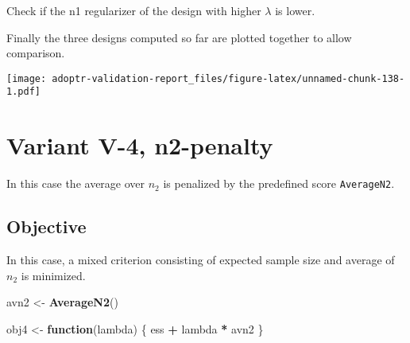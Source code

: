 \documentclass[]{book}
\newenvironment{Shaded}{\begin{snugshade}}{\end{snugshade}}
\newcommand{\ControlFlowTok}[1]{\textcolor[rgb]{0.13,0.29,0.53}{\textbf{#1}}}
\newcommand{\DecValTok}[1]{\textcolor[rgb]{0.00,0.00,0.81}{#1}}
\newcommand{\KeywordTok}[1]{\textcolor[rgb]{0.13,0.29,0.53}{\textbf{#1}}}
\newcommand{\NormalTok}[1]{#1}
\newcommand{\OperatorTok}[1]{\textcolor[rgb]{0.81,0.36,0.00}{\textbf{#1}}}
\newcommand{\StringTok}[1]{\textcolor[rgb]{0.31,0.60,0.02}{#1}}
\begin{document}
\begin{Shaded}
\end{Shaded}

Check if the n1 regularizer of the design with higher \(\lambda\) is lower.

\begin{Shaded}
\end{Shaded}

Finally the three designs computed so far are plotted together to allow
comparison.

\texttt{[image: adoptr-validation-report\_files/figure-latex/unnamed-chunk-138-1.pdf]}

\hypertarget{variantV_4}{%
\section{Variant V-4, n2-penalty}\label{variantV_4}}

In this case the average over \(n_2\) is penalized by the predefined score
\texttt{AverageN2}.

\hypertarget{objective-13}{%
\subsection{Objective}\label{objective-13}}

In this case, a mixed criterion consisting of expected sample size and
average of \(n_2\) is minimized.

\begin{Shaded}
\begin{Highlighting}[]
\NormalTok{avn2 <-}\StringTok{ }\KeywordTok{AverageN2}\NormalTok{()}

\NormalTok{obj4 <-}\StringTok{ }\ControlFlowTok{function}\NormalTok{(lambda) \{}
\NormalTok{    ess }\OperatorTok{+}\StringTok{ }\NormalTok{lambda }\OperatorTok{*}\StringTok{ }\NormalTok{avn2}
\NormalTok{\}}
\end{Highlighting}
\end{Shaded}
\end{document}
